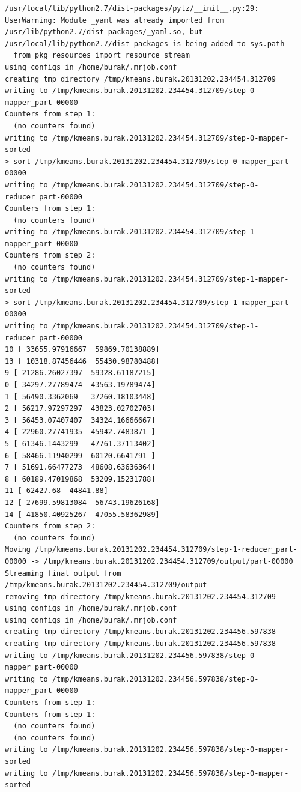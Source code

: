 \documentclass[12pt,fleqn]{article}\usepackage{../common}
\begin{document}
\begin{verbatim}
/usr/local/lib/python2.7/dist-packages/pytz/__init__.py:29: UserWarning: Module _yaml was already imported from /usr/lib/python2.7/dist-packages/_yaml.so, but /usr/local/lib/python2.7/dist-packages is being added to sys.path
  from pkg_resources import resource_stream
using configs in /home/burak/.mrjob.conf
creating tmp directory /tmp/kmeans.burak.20131202.234454.312709
writing to /tmp/kmeans.burak.20131202.234454.312709/step-0-mapper_part-00000
Counters from step 1:
  (no counters found)
writing to /tmp/kmeans.burak.20131202.234454.312709/step-0-mapper-sorted
> sort /tmp/kmeans.burak.20131202.234454.312709/step-0-mapper_part-00000
writing to /tmp/kmeans.burak.20131202.234454.312709/step-0-reducer_part-00000
Counters from step 1:
  (no counters found)
writing to /tmp/kmeans.burak.20131202.234454.312709/step-1-mapper_part-00000
Counters from step 2:
  (no counters found)
writing to /tmp/kmeans.burak.20131202.234454.312709/step-1-mapper-sorted
> sort /tmp/kmeans.burak.20131202.234454.312709/step-1-mapper_part-00000
writing to /tmp/kmeans.burak.20131202.234454.312709/step-1-reducer_part-00000
10 [ 33655.97916667  59869.70138889]
13 [ 10318.87456446  55430.98780488]
9 [ 21286.26027397  59328.61187215]
0 [ 34297.27789474  43563.19789474]
1 [ 56490.3362069   37260.18103448]
2 [ 56217.97297297  43823.02702703]
3 [ 56453.07407407  34324.16666667]
4 [ 22960.27741935  45942.7483871 ]
5 [ 61346.1443299   47761.37113402]
6 [ 58466.11940299  60120.6641791 ]
7 [ 51691.66477273  48608.63636364]
8 [ 60189.47019868  53209.15231788]
11 [ 62427.68  44841.88]
12 [ 27699.59813084  56743.19626168]
14 [ 41850.40925267  47055.58362989]
Counters from step 2:
  (no counters found)
Moving /tmp/kmeans.burak.20131202.234454.312709/step-1-reducer_part-00000 -> /tmp/kmeans.burak.20131202.234454.312709/output/part-00000
Streaming final output from /tmp/kmeans.burak.20131202.234454.312709/output
removing tmp directory /tmp/kmeans.burak.20131202.234454.312709
using configs in /home/burak/.mrjob.conf
using configs in /home/burak/.mrjob.conf
creating tmp directory /tmp/kmeans.burak.20131202.234456.597838
creating tmp directory /tmp/kmeans.burak.20131202.234456.597838
writing to /tmp/kmeans.burak.20131202.234456.597838/step-0-mapper_part-00000
writing to /tmp/kmeans.burak.20131202.234456.597838/step-0-mapper_part-00000
Counters from step 1:
Counters from step 1:
  (no counters found)
  (no counters found)
writing to /tmp/kmeans.burak.20131202.234456.597838/step-0-mapper-sorted
writing to /tmp/kmeans.burak.20131202.234456.597838/step-0-mapper-sorted

\end{verbatim}
\end{document}
